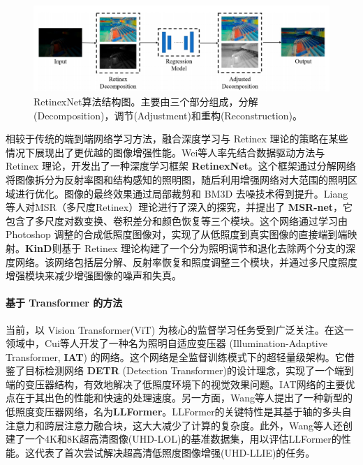\documentclass[a4paper]{ctexart}
\begin{document}
	\begin{figure}[htb]
		\centering 
		\includegraphics[width=0.7\columnwidth]{picture/LLIE/RetinexNet/RetinexNet}
		\caption{
			\label{fig: RetinexNet} 
			RetinexNet算法结构图。主要由三个部分组成，分解(Decomposition)，调节(Adjustment)和重构(Reconstruction)。
		}
	\end{figure}
	
	相较于传统的端到端网络学习方法，融合深度学习与 Retinex 理论的策略在某些情况下展现出了更优越的图像增强性能。Wei等人\cite{wei2018deep}率先结合数据驱动方法与 Retinex 理论，开发出了一种深度学习框架 \textbf{RetinexNet}。这个框架通过分解网络将图像拆分为反射率图和结构感知的照明图，随后利用增强网络对大范围的照明区域进行优化。图像的最终效果通过局部裁剪和 BM3D 去噪技术得到提升。Liang等人\cite{shen2017msr}对MSR（多尺度Retinex）理论进行了深入的探究，并提出了 \textbf{MSR-net}，它包含了多尺度对数变换、卷积差分和颜色恢复等三个模块。这个网络通过学习由 Photoshop 调整的合成低照度图像对，实现了从低照度到真实图像的直接端到端映射。\textbf{KinD}\cite{zhang2019kindling}则基于 Retinex 理论构建了一个分为照明调节和退化去除两个分支的深度网络。该网络包括层分解、反射率恢复和照度调整三个模块，并通过多尺度照度增强模块来减少增强图像的噪声和失真。
	
	\paragraph{基于 Transformer 的方法}
	
	当前，以 Vision Transformer(ViT) 为核心的监督学习任务受到广泛关注。在这一领域中，Cui等人\cite{cui2022illumination}开发了一种名为照明自适应变压器 (Illumination-Adaptive Transformer, \textbf{IAT}) 的网络。这个网络是全监督训练模式下的超轻量级架构。它借鉴了目标检测网络 \textbf{DETR} (Detection Transformer)的设计理念\cite{carion2020end}，实现了一个端到端的变压器结构，有效地解决了低照度环境下的视觉效果问题。IAT网络的主要优点在于其出色的性能和快速的处理速度。另一方面，Wang等人\cite{wang2023ultra}提出了一种新型的低照度变压器网络，名为\textbf{LLFormer}。LLFormer的关键特性是其基于轴的多头自注意力和跨层注意力融合块，这大大减少了计算的复杂度。此外，Wang等人还创建了一个4K和8K超高清图像(UHD-LOL)的基准数据集，用以评估LLFormer的性能。这代表了首次尝试解决超高清低照度图像增强(UHD-LLIE)的任务。
	
\end{document}
